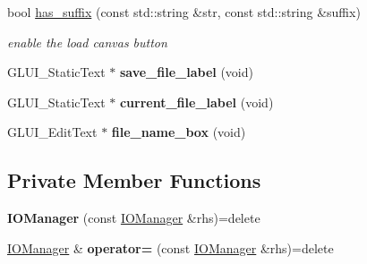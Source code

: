 \begin{DoxyCompactItemize}
bool \hyperlink{classimage__tools_1_1IOManager_ab8176a3f8684b1da88565a84c752494e}{has\+\_\+suffix} (const std\+::string \&str, const std\+::string \&suffix)
\begin{DoxyCompactList}\small\item\em enable the load canvas button \end{DoxyCompactList}\item 
G\+L\+U\+I\+\_\+\+Static\+Text $\ast$ {\bfseries save\+\_\+file\+\_\+label} (void)\hypertarget{classimage__tools_1_1IOManager_a44ee0e7d400f05f1ebf992eb5faa6902}{}\label{classimage__tools_1_1IOManager_a44ee0e7d400f05f1ebf992eb5faa6902}

\item 
G\+L\+U\+I\+\_\+\+Static\+Text $\ast$ {\bfseries current\+\_\+file\+\_\+label} (void)\hypertarget{classimage__tools_1_1IOManager_a21fb95777da9b6b0059fe89bbac79666}{}\label{classimage__tools_1_1IOManager_a21fb95777da9b6b0059fe89bbac79666}

\item 
G\+L\+U\+I\+\_\+\+Edit\+Text $\ast$ {\bfseries file\+\_\+name\+\_\+box} (void)\hypertarget{classimage__tools_1_1IOManager_a1ffebca9d8453a19a051119f3d216784}{}\label{classimage__tools_1_1IOManager_a1ffebca9d8453a19a051119f3d216784}

\end{DoxyCompactItemize}
\subsection*{Private Member Functions}
\begin{DoxyCompactItemize}
\item 
{\bfseries I\+O\+Manager} (const \hyperlink{classimage__tools_1_1IOManager}{I\+O\+Manager} \&rhs)=delete\hypertarget{classimage__tools_1_1IOManager_a3d4afeda268cd5f55994c5c055dcb50f}{}\label{classimage__tools_1_1IOManager_a3d4afeda268cd5f55994c5c055dcb50f}

\item 
\hyperlink{classimage__tools_1_1IOManager}{I\+O\+Manager} \& {\bfseries operator=} (const \hyperlink{classimage__tools_1_1IOManager}{I\+O\+Manager} \&rhs)=delete\hypertarget{classimage__tools_1_1IOManager_ab51c42c7007e4fa4da32a943c4beed42}{}\label{classimage__tools_1_1IOManager_ab51c42c7007e4fa4da32a943c4beed42}

\end{DoxyCompactItemize}
